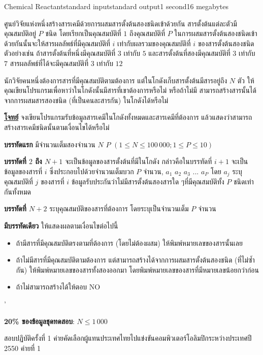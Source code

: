 \documentclass[11pt,a4paper]{article}
\begin{document}
\begin{problem}{Chemical Reactant}{standard input}{standard output}{1 second}{16 megabytes}

ศูนย์วิจัยแห่งหนึ่งสร้างสารเคมีด้วยการผสมสารตั้งต้นสองชนิดเข้าด้วยกัน  สารตั้งต้นแต่ละตัวมีคุณสมบัติอยู่ $P$ ชนิด โดยเรียกเป็นคุณสมบัติที่ $1$ ถึงคุณสมบัติที่ $P$ ในการผสมสารตั้งต้นสองชนิดเข้าด้วยกันนั้นจะให้สารผลลัพธ์ที่มีคุณสมบัติที่ $i$ เท่ากับผลรวมของคุณสมบัติที่ $i$ ของสารตั้งต้นสองชนิด ตัวอย่างเช่น ถ้าสารตั้งต้นที่หนึ่งมีคุณสมบัติที่ $3$ เท่ากับ $5$ และสารตั้งต้นที่สองมีคุณสมบัติที่ $3$ เท่ากับ $7$ สารผลลัพธ์ที่ได้จะมีคุณสมบัติที่ $3$ เท่ากับ $12$

นักวิจัยคนหนึ่งต้องการสารที่มีคุณสมบัติตามต้องการ  แต่ในโกดังเก็บสารตั้งต้นมีสารอยู่ถึง $N$ ตัว ให้คุณเขียนโปรแกรมเพื่อหาว่าในโกดังนั้นมีสารที่เขาต้องการหรือไม่ หรือถ้าไม่มี สามารถสร้างสารนั้นได้จากการผสมสารสองชนิด (ที่เป็นคนละสารกัน) ในโกดังได้หรือไม่

\bigskip
\underline{\textbf{โจทย์}}  จงเขียนโปรแกรมรับข้อมูลสารเคมีในโกดังทั้งหมดและสารเคมีที่ต้องการ แล้วแสดงว่าสามารถสร้างสารเคมีชนิดนั้นตามเงื่อนไขได้หรือไม่

\InputFile

\textbf{บรรทัดแรก} มีจำนวนเต็มสองจำนวน $N$  $P$  $(1 \leq N \leq 100\,000; 1 \leq P \leq 10)$  

\textbf{บรรทัดที่ $2$ ถึง $N+1$ }จะเป็นข้อมูลของสารตั้งต้นที่มีในโกดัง  กล่าวคือในบรรทัดที่ $i+1$ จะเป็นข้อมูลของสารที่ $i$ ซึ่งประกอบไปด้วยจำนวนเต็มบวก $P$ จำนวน, $a_1$ $a_2$ $a_3$ $...$ $a_P$ โดย $a_j$ ระบุคุณสมบัติที่ $j$ ของสารที่ $i$ ข้อมูลรับประกันว่าไม่มีสารตั้งต้นสองสารใด ๆที่มีคุณสมบัติทั้ง $P$ ชนิดเท่ากันทั้งหมด   

\textbf{บรรทัดที่ $N+2$ } ระบุคุณสมบัติของสารที่ต้องการ โดยระบุเป็นจำนวนเต็ม $P$ จำนวน

\OutputFile

\textbf{มีบรรทัดเดียว} ให้แสดงผลตามเงื่อนไขต่อไปนี้
\begin{itemize}

\item ถ้ามีสารที่มีคุณสมบัติตรงตามที่ต้องการ (โดยไม่ต้องผสม) ให้พิมพ์หมายเลขของสารนั้นเลย
\item ถ้าไม่มีสารที่มีคุณสมบัติตามต้องการ แต่สามารถสร้างได้จากการผสมสารตั้งต้นสองชนิด (ที่ไม่ซ้ำกัน) ให้พิมพ์หมายเลขของสารทั้งสองออกมา โดยพิมพ์หมายเลขของสารที่มีหมายเลขน้อยกว่าก่อน  
\item ถ้าไม่สามารถสร้างได้ให้ตอบ NO
\end{itemize}
'
\Examples

\begin{example}
%
%
%
\end{example}

\Scoring

\textbf{20\% ของข้อมูลชุดทดสอบ}: $N \leq 1\,000$

\Source

สอบปฏิบัติครั้งที่ 1 ค่ายคัดเลือกผู้แทนประเทศไทยไปแข่งขันคอมพิวเตอร์โอลิมปิกระหว่างประเทศปี 2550 ค่ายที่ 1

\end{problem}
\end{document}
